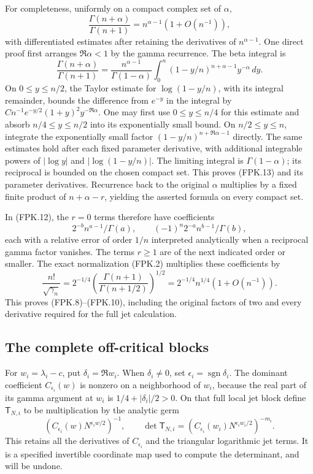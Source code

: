 \documentclass[11pt,a4paper]{article}
\begin{document}
For completeness, uniformly on a compact complex set of $\alpha$,
\[
 \frac{\Gamma(n+\alpha)}{\Gamma(n+1)}
       =n^{\alpha-1}(1+O(n^{-1})),
 \tag{FPK.13}
\]
with differentiated estimates after retaining the derivatives of
$n^{\alpha-1}$. One direct proof first arranges
$\Re\alpha<1$ by the gamma recurrence. The beta integral is
\[
 \frac{\Gamma(n+\alpha)}{\Gamma(n+1)}
   =\frac{n^{\alpha-1}}{\Gamma(1-\alpha)}
     \int_0^n(1-y/n)^{n+\alpha-1}y^{-\alpha}\,dy.
\]
On $0\leq y\leq n/2$, the Taylor estimate for $\log(1-y/n)$,
with its integral remainder, bounds the difference from $e^{-y}$
in the integral by $C n^{-1}e^{-y/2}(1+y)^2y^{-\Re\alpha}$.
One may first use $0\leq y\leq n/4$ for this estimate and absorb
$n/4\leq y\leq n/2$ into its exponentially small bound. On
$n/2\leq y\leq n$, integrate the exponentially small factor
$(1-y/n)^{n+\Re\alpha-1}$ directly. The same estimates hold after
each fixed parameter derivative, with additional integrable powers
of $|\log y|$ and $|\log(1-y/n)|$. The limiting integral is
$\Gamma(1-\alpha)$; its reciprocal is bounded on the chosen compact
set. This proves (FPK.13) and its parameter derivatives. Recurrence
back to the original $\alpha$ multiplies by a fixed finite product
of $n+\alpha-r$, yielding the asserted formula on every compact set.

In (FPK.12), the $r=0$ terms therefore have coefficients
\[
 2^{-b}n^{a-1}/\Gamma(a),\qquad
 (-1)^n2^{-a}n^{b-1}/\Gamma(b),
\]
each with a relative error of order
$1/n$ interpreted analytically when a reciprocal gamma factor
vanishes. The terms $r\geq1$ are of the next indicated order or
smaller. The exact normalization (FPK.2) multiplies these coefficients
by
\[
 \frac{n!}{\sqrt{\gamma_n}}
    =2^{-1/4}\left(\frac{\Gamma(n+1)}{\Gamma(n+1/2)}\right)^{1/2}
    =2^{-1/4}n^{1/4}(1+O(n^{-1})).
\]
This proves (FPK.8)--(FPK.10), including the original factors of two
and every derivative required for the full jet calculation.

\subsection{The complete off-critical blocks}

For $w_i=\lambda_i-c$, put $\delta_i=\Re w_i$. When
$\delta_i\ne0$, set $\epsilon_i=\operatorname{sgn}\delta_i$.
The dominant coefficient $C_{\epsilon_i}(w)$ is nonzero on a
neighborhood of $w_i$, because the real part of its gamma argument
at $w_i$ is $1/4+|\delta_i|/2>0$. On that full local jet block
define $\mathsf T_{N,i}$ to be multiplication by the analytic germ
\[
 \left(C_{\epsilon_i}(w)N^{\epsilon_i w/2}\right)^{-1},
 \qquad \det\mathsf T_{N,i}
       =\left(C_{\epsilon_i}(w_i)N^{\epsilon_iw_i/2}\right)^{-m_i}.
 \tag{FPK.14}
\]
This retains all the derivatives of $C_{\epsilon_i}$ and the
triangular logarithmic jet terms. It is a specified invertible
coordinate map used to compute the determinant, and will be undone.
\end{document}

